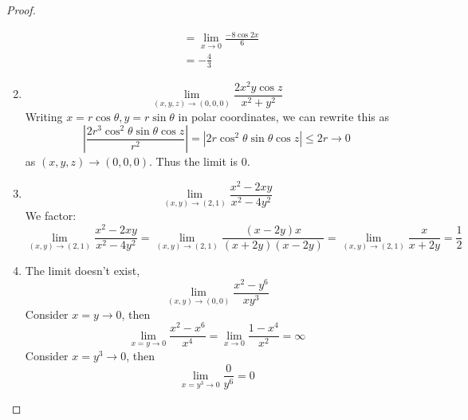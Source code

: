 \documentclass[openany]{book}
\begin{document}
\begin{proof}
\begin{enumerate}
\begin{align*}
            &=\lim_{x\to 0}\frac{-8\cos 2x}{6}\\
            &=-\frac{4}{3}
        \end{align*}
        \item \begin{equation*}
            \lim_{(x,y,z)\to(0,0,0)}\frac{2x^2y\cos z}{x^2+y^2}
        \end{equation*}
        Writing $x=r\cos\theta, y=r\sin\theta$ in polar coordinates, we can rewrite this as 
        \begin{equation*}
            \left|\frac{2r^3\cos^2\theta\sin\theta\cos z}{r^2}\right|=|2r\cos^2\theta\sin\theta\cos z|\leq 2r\to 0
        \end{equation*}
        as $(x,y,z)\to(0,0,0)$. Thus the limit is $0$.
        \item \begin{equation*}
            \lim_{(x,y)\to(2,1)}\frac{x^2-2xy}{x^2-4y^2}
        \end{equation*}
        We factor:
        \begin{equation*}
            \lim_{(x,y)\to(2,1)}\frac{x^2-2xy}{x^2-4y^2}=\lim_{(x,y)\to(2,1)}\frac{(x-2y)x}{(x+2y)(x-2y)}=\lim_{(x,y)\to(2,1)}\frac{x}{x+2y}=\frac{1}{2}
        \end{equation*}
        \item The limit doesn't exist, \begin{equation*}
            \lim_{(x,y)\to(0,0)}\frac{x^2-y^6}{xy^3}
        \end{equation*}
        Consider $x=y\to 0$, then 
        \begin{equation*}
            \lim_{x=y\to 0}\frac{x^2-x^6}{x^4}=\lim_{x\to 0}\frac{1-x^4}{x^2}=\infty
        \end{equation*}
        Consider $x=y^3\to 0$, then 
        \begin{equation*}
            \lim_{x=y^3\to 0}\frac{0}{y^6}=0
        \end{equation*}
    \end{enumerate}
\end{proof}
\end{document}

